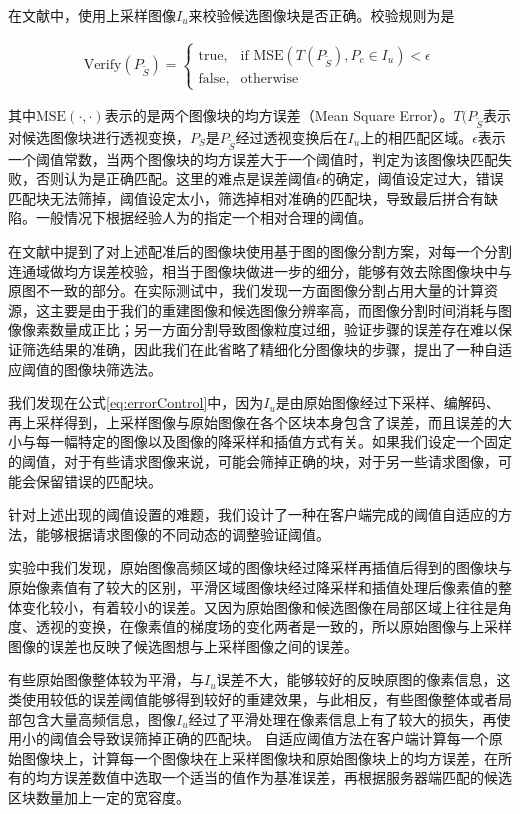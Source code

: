 \documentclass[UTF8]{csoarticle}
\begin{document}
在文献\cite{Dai:2012vn}中，使用上采样图像\(I_u\)来校验候选图像块是否正确。校验规则为是

\begin{align}
\label{eq:errorControl}
  \text{Verify}(P_{\tilde{S}}) = 
\begin{cases} 
\text{true}, & \mbox{if MSE} (T(P_{\tilde{S}}),P_c \in I_u) < \epsilon \\
\text{false}, & \mbox{otherwise}
\end{cases}
\end{align}

其中\(\text{MSE}(\cdot,\cdot)\)表示的是两个图像块的均方误差（Mean Square Error）。\(T(P_{\tilde{S}}\)表示对候选图像块进行透视变换，\(P_{S}\)是\(P_{\tilde{S}}\)经过透视变换后在\(I_u\)上的相匹配区域。\(\epsilon\)表示一个阈值常数，当两个图像块的均方误差大于一个阈值时，判定为该图像块匹配失败，否则认为是正确匹配。这里的难点是误差阈值\(\epsilon\)的确定，阈值设定过大，错误匹配块无法筛掉，阈值设定太小，筛选掉相对准确的匹配块，导致最后拼合有缺陷。一般情况下根据经验人为的指定一个相对合理的阈值。

在文献\cite{Dai:2012vn}中提到了对上述配准后的图像块使用基于图的图像分割方案，对每一个分割连通域做均方误差校验，相当于图像块做进一步的细分，能够有效去除图像块中与原图不一致的部分。在实际测试中，我们发现一方面图像分割占用大量的计算资源，这主要是由于我们的重建图像和候选图像分辨率高，而图像分割时间消耗与图像像素数量成正比；另一方面分割导致图像粒度过细，验证步骤的误差存在难以保证筛选结果的准确，因此我们在此省略了精细化分图像块的步骤，提出了一种自适应阈值的图像块筛选法。

我们发现在公式\ref{eq:errorControl}中，因为\(I_u\)是由原始图像经过下采样、编解码、再上采样得到，上采样图像与原始图像在各个区块本身包含了误差，而且误差的大小与每一幅特定的图像以及图像的降采样和插值方式有关。如果我们设定一个固定的阈值，对于有些请求图像来说，可能会筛掉正确的块，对于另一些请求图像，可能会保留错误的匹配块。

针对上述出现的阈值设置的难题，我们设计了一种在客户端完成的阈值自适应的方法，能够根据请求图像的不同动态的调整验证阈值。

实验中我们发现，原始图像高频区域的图像块经过降采样再插值后得到的图像块与原始像素值有了较大的区别，平滑区域图像块经过降采样和插值处理后像素值的整体变化较小，有着较小的误差。又因为原始图像和候选图像在局部区域上往往是角度、透视的变换，在像素值的梯度场的变化两者是一致的，所以原始图像与上采样图像的误差也反映了候选图想与上采样图像之间的误差。

有些原始图像整体较为平滑，与\(I_u\)误差不大，能够较好的反映原图的像素信息，这类使用较低的误差阈值能够得到较好的重建效果，与此相反，有些图像整体或者局部包含大量高频信息，图像\(I_u\)经过了平滑处理在像素信息上有了较大的损失，再使用小的阈值会导致误筛掉正确的匹配块。
自适应阈值方法在客户端计算每一个原始图像块上，计算每一个图像块在上采样图像块和原始图像块上的均方误差，在所有的均方误差数值中选取一个适当的值作为基准误差，再根据服务器端匹配的候选区块数量加上一定的宽容度。
\end{document}
